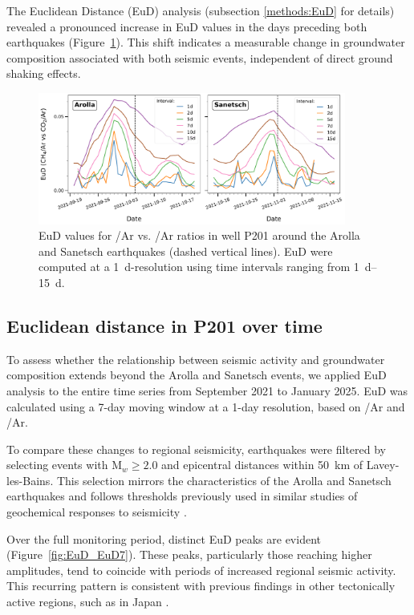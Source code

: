 The Euclidean Distance (EuD) analysis (subsection \ref{methods:EuD} for details) revealed a pronounced increase in EuD values in the days preceding both earthquakes (Figure~\ref{fig:EuD_SanAr}).
This shift indicates a measurable change in groundwater composition associated with both seismic events, independent of direct ground shaking effects. \citep{giroud2023new}

\begin{figure}[H]
    \centering
    \includegraphics[width=0.9\textwidth]{chapters/04_chap3/figures/article_EuD_SanAr.pdf}
    \caption{EuD values for /Ar vs. /Ar ratios in well P201 around the Arolla and Sanetsch earthquakes (dashed vertical lines).
    EuD were computed at a \SI{1}{\day}-resolution using time intervals ranging from \SIrange{1}{15}{\day}.
    }
    \label{fig:EuD_SanAr}
\end{figure}

\subsection{Euclidean distance in P201 over time}
To assess whether the relationship between seismic activity and groundwater composition extends beyond the Arolla and Sanetsch events, we applied EuD analysis to the entire time series from September 2021 to January 2025.
EuD was calculated using a 7-day moving window at a 1-day resolution, based on /Ar and /Ar.

To compare these changes to regional seismicity, earthquakes were filtered by selecting events with M$_w \geq 2.0$ and epicentral distances within \SI{50}{\kilo\meter} of Lavey-les-Bains.
This selection mirrors the characteristics of the Arolla and Sanetsch earthquakes and follows thresholds previously used in similar studies of geochemical responses to seismicity \citep{chiodini2020co2}.

Over the full monitoring period, distinct EuD peaks are evident (Figure~\ref{fig:EuD_EuD7}).
These peaks, particularly those reaching higher amplitudes, tend to coincide with periods of increased regional seismic activity.
This recurring pattern is consistent with previous findings in other tectonically active regions, such as in Japan \citep{giroud2023new}.

